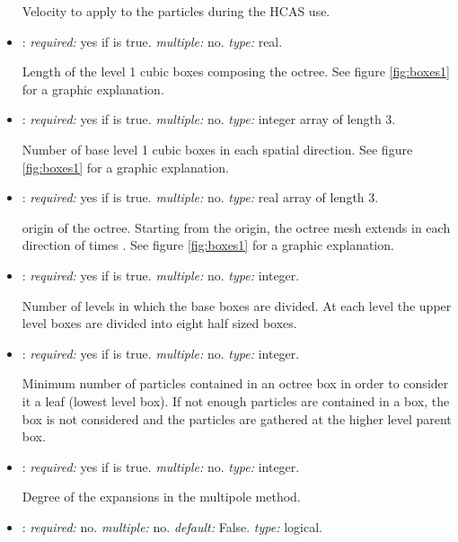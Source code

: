 \begin{itemize}
Velocity to apply to the particles during the HCAS use. 

\item {}: \textit{required:} yes if  is true. \textit{multiple:} no. \textit{type:} real.

Length of the level 1 cubic boxes composing the octree. See figure \ref{fig:boxes1} for a graphic explanation.

\item {}: \textit{required:} yes if  is true. \textit{multiple:} no. \textit{type:} integer array of length 3.

Number of base level 1 cubic boxes in each spatial direction. See figure \ref{fig:boxes1} for a graphic explanation.

\item {}: \textit{required:} yes if  is true. \textit{multiple:} no. \textit{type:} real array of length 3. 

origin of the octree. Starting from the origin, the octree mesh extends in each direction of  times . See figure \ref{fig:boxes1} for a graphic explanation.

\item {}: \textit{required:} yes if  is true. \textit{multiple:} no. \textit{type:} integer.

Number of levels in  which the base boxes are divided. At each level the upper level boxes are divided into eight half sized boxes. 

\item {}: \textit{required:} yes if  is true. \textit{multiple:} no. \textit{type:} integer.

Minimum number of particles contained in an octree box in order to consider it a leaf (lowest level box). If not enough particles are contained in a box, the box is not considered and the particles are gathered at the higher level parent box.

\item {}: \textit{required:} yes if  is true. \textit{multiple:} no. \textit{type:} integer.

Degree of the expansions in the multipole method. 

\item {}: \textit{required:} no. \textit{multiple:} no. \textit{default:} False. \textit{type:} logical.


\end{itemize}
